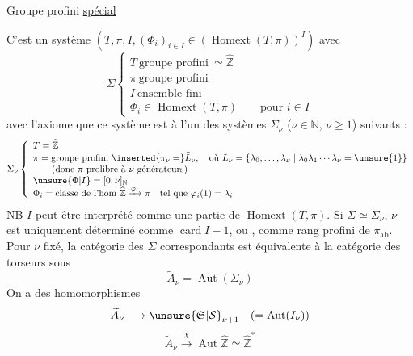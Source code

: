 Groupe profini \uline{spécial}

 C'est un système \inserted{$\Sigma=$}
$(T,\pi,I,(\Phi_i)_{i\in I}\in(\operatorname{Homext}(T,\pi))^I)$
avec
\[
\Sigma\left\{\begin{array}{l}
T\ \text{groupe profini}\ \simeq\widehat{\mathbb Z}\\
\pi\ \text{groupe profini}\\
I\ \text{ensemble fini}\\
\Phi_i\in\operatorname{Homext}(T,\pi)\qquad\text{pour }i\in I
\end{array}\right.
\]
avec l'axiome que ce système est 
à l'un des systèmes $\Sigma_\nu$ ($\nu\in\mathbb N$, $\nu\geq1$)
suivants :
\[
\Sigma_\nu\left\{\begin{array}{l}
T=\widehat{\mathbb Z}\\
\pi=\text{groupe profini }\inserted{\pi_\nu=}\widehat L_\nu,\quad
\text{où }L_\nu=\{\lambda_0,\ldots,\lambda_\nu\mid\lambda_0\lambda_1\cdots\lambda_\nu=\unsure{1}\}\\
\qquad(\text{donc }\pi\text{ prolibre à }\nu\text{ générateurs})\\
\unsure{\Phi|I}=[0,\nu]_{\mathbb N}\\
\Phi_i=\text{classe de l'hom }\widehat{\mathbb Z}\xrightarrow{\varphi_i}\pi
\quad\text{tel que }\varphi_i(1)=\lambda_i
\end{array}\right.
\]
\uline{NB} $I$ peut être interprété comme une \uline{partie} de $\operatorname{Homext}(T,\pi)$.
Si $\Sigma\simeq\Sigma_\nu$, $\nu$ est uniquement déterminé
comme $\operatorname{card}I-1$, ou 
, comme rang profini de $\pi_{\mathrm{ab}}$. Pour
$\nu$ fixé, la catégorie des $\Sigma$ correspondants
est équivalente à la catégorie des torseurs
sous
\[
\widetilde A_\nu=\operatorname{Aut}(\Sigma_\nu)
\]
On a des homomorphismes
\[
\widetilde A_\nu\longrightarrow\unsure{\mathfrak S|\mathcal S}_{\nu+1}
\quad(=\operatorname{Aut}(I_\nu))
\]
\[
\widetilde A_\nu\xrightarrow{\chi}\operatorname{Aut}\widehat{\mathbb Z}
\simeq\widehat{\mathbb Z}^{*}
\]
